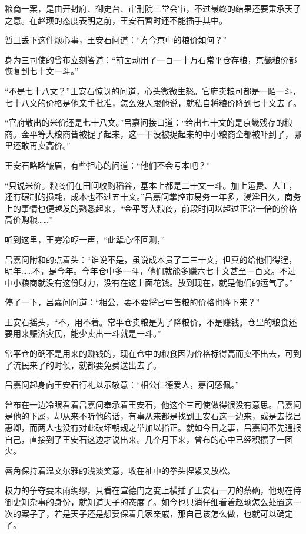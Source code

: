 粮商一案，是由开封府、御史台、审刑院三堂会审，不过最终的结果还要秉承天子之意。在赵顼的态度表明之前，王安石暂时还不能插手其中。

暂且丢下这件烦心事，王安石问道：“方今京中的粮价如何？”

身为三司使的曾布立刻答道：“前面动用了一百一十万石常平仓存粮，京畿粮价都恢复到七十文一斗。”

“不是七十八文？”王安石惊讶的问道，心头微微生怒。官府卖粮可都是一陌一斗，七十八文的价格是他亲手批准，怎么没人跟他说，就私自将粮价降到七十文去了。

“官府散出的米价还是七十八文。”吕嘉问接口道：“给出七十文的是京畿残存的粮商。金平等大粮商皆被捉了起来，这一干没被捉起来的中小粮商全都被吓到了，哪里还敢再卖高价。”

王安石略略皱眉，有些担心的问道：“他们不会亏本吧？”

“只说米价。粮商们在田间收购稻谷，基本上都是二十文一斗。加上运费、人工，还有碾制的损耗，成本也不过五十文。”吕嘉问掌控市易务一年多，浸淫日久，商务上的事情也便越发的熟悉起来，“金平等大粮商，前段时间以超过正常一倍的价格高价购粮……”

听到这里，王雱冷哼一声，“此辈心怀叵测，”

吕嘉问附和的点着头：“谁说不是，虽说成本贵了二三十文，但真的给他们得逞，明年……不，是今年。今年仓中多一斗，他们就能多赚六七十文甚至一百文。不过中小粮商就没有这份财力，没有在这上面花钱。放到现在，就是他们的运气了。”

停了一下，吕嘉问问道：“相公，要不要将官中售粮的价格也降下来？”

王安石摇头，“不，用不着。常平仓卖粮是为了降粮价，不是赚钱。仓里的粮食还要用来赈济灾民，能少卖出一斗就是一斗。”

常平仓的确不是用来的赚钱的，现在仓中的粮食因为价格标得高而卖不出去，可到了流民来了的时候，就都要免费送出去了。

吕嘉问起身向王安石行礼以示敬意：“相公仁德爱人，嘉问感佩。”

曾布在一边冷眼看着吕嘉问奉承着王安石，他这个三司使做得很没有意思。吕嘉问是他的下属，却从来不听他的话，有事从来都是找到王安石这一边来，或是去找吕惠卿，而两人也没有对此破坏朝规之举加以指正。就如今日之事，吕嘉问不先通报自己，直接到了王安石这边才说出来。几个月下来，曾布的心中已经积攒了一团火。

唇角保持着温文尔雅的浅淡笑意，收在袖中的拳头捏紧又放松。

权力的争夺要未雨绸缪，只看在宣德门之变上横插了王安石一刀的蔡确，他现在侍御史知杂事的身份，就知道天子的态度了。如今也只消仔细看着赵顼怎么处置这一次的案子了，若是天子还是想要保着几家亲戚，那自己该怎么做，也就可以确定了。

